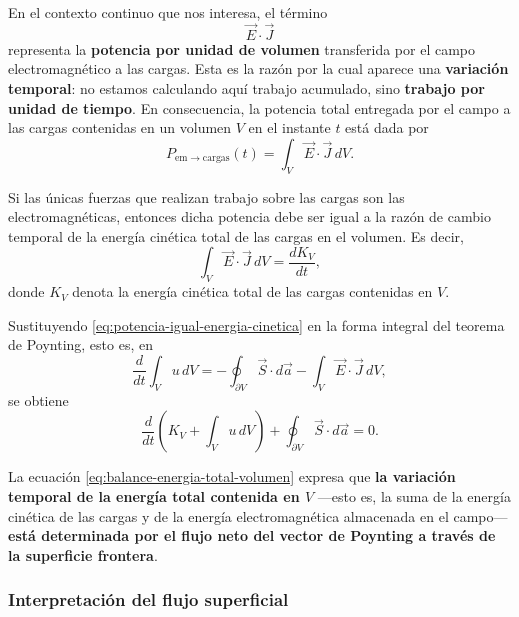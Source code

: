 \documentclass[12pt,a4paper]{article}
\theoremstyle{definition}
\theoremstyle{plain}
\numberwithin{equation}{section}
\theoremstyle{remark}
\newcommand{\E}{\vec{E}}
\newcommand{\J}{\vec{J}}
\begin{document}
En el contexto continuo que nos interesa, el término
\begin{equation*}
    \E\cdot\J
\end{equation*}
representa la \textbf{potencia por unidad de volumen} transferida por el campo electromagnético a las cargas. Esta es la razón por la cual aparece una \textbf{variación temporal}: no estamos calculando aquí trabajo acumulado, sino \textbf{trabajo por unidad de tiempo}. En consecuencia, la potencia total entregada por el campo a las cargas contenidas en un volumen $V$ en el instante $t$ está dada por
\begin{equation*}
    P_{\mathrm{em}\to\mathrm{cargas}}(t)=\int_V \E\cdot\J\,dV.
\end{equation*}

Si las únicas fuerzas que realizan trabajo sobre las cargas son las electromagnéticas, entonces dicha potencia debe ser igual a la razón de cambio temporal de la energía cinética total de las cargas en el volumen. Es decir,
\begin{equation}
    \int_V \E\cdot\J\,dV=\frac{dK_V}{dt},
    \label{eq:potencia-igual-energia-cinetica}
\end{equation}
donde $K_V$ denota la energía cinética total de las cargas contenidas en $V$.

Sustituyendo \eqref{eq:potencia-igual-energia-cinetica} en la forma integral del teorema de Poynting, esto es, en
\begin{equation*}
    \frac{d}{dt}\int_V u\,dV
    =
    -\oint_{\partial V}\vec S\cdot d\vec a
    -
    \int_V \E\cdot\J\,dV,
\end{equation*}
se obtiene
\begin{equation}
    \frac{d}{dt}\left(
        K_V+\int_V u\,dV
    \right)
    +
    \oint_{\partial V}\vec S\cdot d\vec a
    =
    0.
    \label{eq:balance-energia-total-volumen}
\end{equation}

La ecuación \eqref{eq:balance-energia-total-volumen} expresa que \textbf{la variación temporal de la energía total contenida en $V$} ---esto es, la suma de la energía cinética de las cargas y de la energía electromagnética almacenada en el campo--- \textbf{está determinada por el flujo neto del vector de Poynting a través de la superficie frontera}.

\subsubsection*{Interpretación del flujo superficial}
\end{document}

